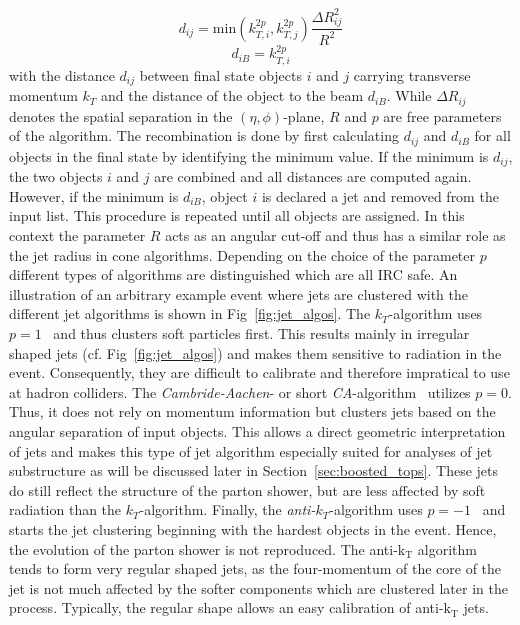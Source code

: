\begin{description}
\begin{equation*}
d_{ij} = \mathrm{min}(k_{T,i}^{2p}, k_{T,j}^{2p}) \frac{\Delta R_{ij}^2}{R^2}
\end{equation*}
\begin{equation*}
d_{iB} = k_{T,i}^{2p}
\end{equation*}
with the distance $d_{ij}$ between final state objects $i$ and $j$ carrying transverse momentum $k_T$ and the distance of the object to the beam $d_{iB}$. While $\Delta R_{ij}$ denotes the spatial separation in the $(\eta, \phi)$-plane, $R$ and $p$ are free parameters of the algorithm. The recombination is done by first calculating $d_{ij}$ and $d_{iB}$ for all objects in the final state by identifying the minimum value. If the minimum is $d_{ij}$, the two objects $i$ and $j$ are combined and all distances are computed again. However, if the minimum is $d_{iB}$, object $i$ is declared a jet and removed from the input list. This procedure is repeated until all objects are assigned. In this context the parameter $R$ acts as an angular cut-off and thus has a similar role as the jet radius in cone algorithms. Depending on the choice of the parameter $p$ different types of algorithms are distinguished which are all IRC safe. An illustration of an arbitrary example event where jets are clustered with the different jet algorithms is shown in Fig~\ref{fig:jet_algos}. The $k_T$-algorithm uses $p = 1$~\cite{PhysRevD.48.3160} and thus clusters soft particles first. This results mainly in irregular shaped jets (cf. Fig~\ref{fig:jet_algos}) and makes them sensitive to radiation in the event. Consequently, they are difficult to calibrate and therefore impratical to use at hadron colliders. The \textit{Cambride-Aachen}- or short \textit{CA}-algorithm~\cite{Dokshitzer:1997in, Wobisch:1998wt} utilizes $p = 0$. Thus, it does not rely on momentum information but clusters jets based on the angular separation of input objects. This allows a direct geometric interpretation of jets and makes this type of jet algorithm especially suited for analyses of jet substructure as will be discussed later in Section~\ref{sec:boosted_tops}. These jets do still reflect the structure of the parton shower, but are less affected by soft radiation than the $k_T$-algorithm. Finally, the \textit{anti-$k_T$}-algorithm uses $p = -1$~\cite{1126-6708-2008-04-063} and starts the jet clustering beginning with the hardest objects in the event. Hence, the evolution of the parton shower is not reproduced. The anti-$\mathrm{k_T}$ algorithm tends to form very regular shaped jets, as the four-momentum of the core of the jet is not much affected by the softer components which are clustered later in the process. Typically, the regular shape allows an easy calibration of anti-$\mathrm{k_T}$ jets. 
\end{description}

